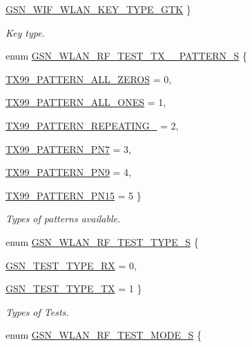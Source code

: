 \begin{DoxyCompactItemize}
\par
\hyperlink{a00640_gga738f68b803d29587618534b884d8b600aeb6b6a4473c3d874d150972fb22d0975}{GSN\_\-WIF\_\-WLAN\_\-KEY\_\-TYPE\_\-GTK}
 \}
\begin{DoxyCompactList}\small\item\em Key type. \end{DoxyCompactList}\item 
enum \hyperlink{a00677_ga651010efc8cff4e360fd72c7d32a70a9}{GSN\_\-WLAN\_\-RF\_\-TEST\_\-TX\_\_\-PATTERN\_\-S} \{ \par
\hyperlink{a00640_gga651010efc8cff4e360fd72c7d32a70a9a7b0f6c4fc037430360bb1a515fbd2261}{TX99\_\-PATTERN\_\-ALL\_\-ZEROS} =  0, 
\par
\hyperlink{a00640_gga651010efc8cff4e360fd72c7d32a70a9ac5997221faab077928ba36901f9ac13d}{TX99\_\-PATTERN\_\-ALL\_\-ONES} =  1, 
\par
\hyperlink{a00640_gga651010efc8cff4e360fd72c7d32a70a9ab3b8555f274736bb950108d0bd3c598b}{TX99\_\-PATTERN\_\-REPEATING\_} =  2, 
\par
\hyperlink{a00640_gga651010efc8cff4e360fd72c7d32a70a9ae96c1a78fb24fcbe775fefda62757452}{TX99\_\-PATTERN\_\-PN7} =  3, 
\par
\hyperlink{a00640_gga651010efc8cff4e360fd72c7d32a70a9a55c749918a1b75ad9ab5091c250e8c0e}{TX99\_\-PATTERN\_\-PN9} =  4, 
\par
\hyperlink{a00640_gga651010efc8cff4e360fd72c7d32a70a9a46eb7d7ab33b8cc68e2a3cf127375470}{TX99\_\-PATTERN\_\-PN15} =  5
 \}
\begin{DoxyCompactList}\small\item\em Types of patterns available. \end{DoxyCompactList}\item 
enum \hyperlink{a00677_ga3c5fd791827dffd656e69ad09ce2304e}{GSN\_\-WLAN\_\-RF\_\-TEST\_\-TYPE\_\-S} \{ \par
\hyperlink{a00640_gga3c5fd791827dffd656e69ad09ce2304eaca614bc30bd8954133ec65e0d1476b2d}{GSN\_\-TEST\_\-TYPE\_\-RX} =  0, 
\par
\hyperlink{a00640_gga3c5fd791827dffd656e69ad09ce2304eac474ecc66322eaff905fd8428af8f25f}{GSN\_\-TEST\_\-TYPE\_\-TX} =  1
 \}
\begin{DoxyCompactList}\small\item\em Types of Tests. \end{DoxyCompactList}\item 
enum \hyperlink{a00677_ga8d2c2dc6c9f7927c5cf4634d7b403b95}{GSN\_\-WLAN\_\-RF\_\-TEST\_\-MODE\_\-S} \{ \par

\end{DoxyCompactItemize}
